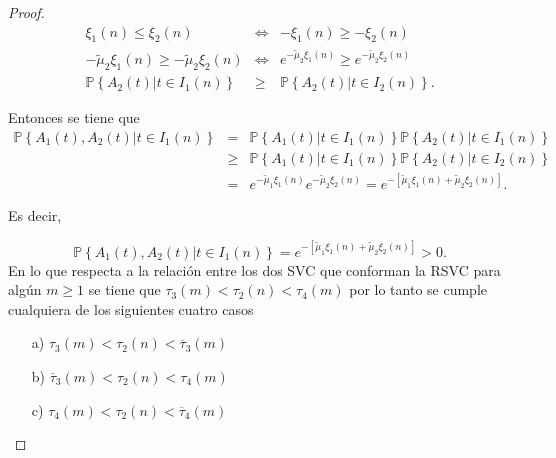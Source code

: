 \documentclass{article}
\newcommand{\prob}{\mathbb{P}}
\begin{document}
\begin{proof}
\begin{eqnarray*}
\xi_{1}\left(n\right)\leq\xi_{2}\left(n\right)&\Leftrightarrow& -\xi_{1}\left(n\right)\geq-\xi_{2}\left(n\right)
\\
-\tilde{\mu}_{2}\xi_{1}\left(n\right)\geq-\tilde{\mu}_{2}\xi_{2}\left(n\right)&\Leftrightarrow&
e^{-\tilde{\mu}_{2}\xi_{1}\left(n\right)}\geq e^{-\tilde{\mu}_{2}\xi_{2}\left(n\right)}\\
\prob\left\{A_{2}\left(t\right)|t\in I_{1}\left(n\right)\right\}&\geq&
\prob\left\{A_{2}\left(t\right)|t\in I_{2}\left(n\right)\right\}.
\end{eqnarray*}


Entonces se tiene que
\small{
\begin{eqnarray*}
\prob\left\{A_{1}\left(t\right),A_{2}\left(t\right)|t\in I_{1}\left(n\right)\right\}&=&
\prob\left\{A_{1}\left(t\right)|t\in I_{1}\left(n\right)\right\}
\prob\left\{A_{2}\left(t\right)|t\in I_{1}\left(n\right)\right\}\\
&\geq&
\prob\left\{A_{1}\left(t\right)|t\in I_{1}\left(n\right)\right\}
\prob\left\{A_{2}\left(t\right)|t\in I_{2}\left(n\right)\right\}\\
&=&e^{-\tilde{\mu}_{1}\xi_{1}\left(n\right)}e^{-\tilde{\mu}_{2}\xi_{2}\left(n\right)}
=e^{-\left[\tilde{\mu}_{1}\xi_{1}\left(n\right)+\tilde{\mu}_{2}\xi_{2}\left(n\right)\right]}.
\end{eqnarray*}}


Es decir, 

\begin{equation}
\prob\left\{A_{1}\left(t\right),A_{2}\left(t\right)|t\in I_{1}\left(n\right)\right\}
=e^{-\left[\tilde{\mu}_{1}\xi_{1}\left(n\right)+\tilde{\mu}_{2}\xi_{2}
\left(n\right)\right]}>0.
\end{equation}
En lo que respecta a la relaci\'on entre los dos SVC que conforman la RSVC para alg\'un $m\geq1$ se tiene que $\tau_{3}\left(m\right)<\tau_{2}\left(n\right)<\tau_{4}\left(m\right)$ por lo tanto se cumple cualquiera de los siguientes cuatro casos
\begin{itemize}
\item[a)] $\tau_{3}\left(m\right)<\tau_{2}\left(n\right)<\overline{\tau}_{3}\left(m\right)$

\item[b)] $\overline{\tau}_{3}\left(m\right)<\tau_{2}\left(n\right)
<\tau_{4}\left(m\right)$

\item[c)] $\tau_{4}\left(m\right)<\tau_{2}\left(n\right)<
\overline{\tau}_{4}\left(m\right)$


\end{itemize}
\end{proof}
\end{document}
